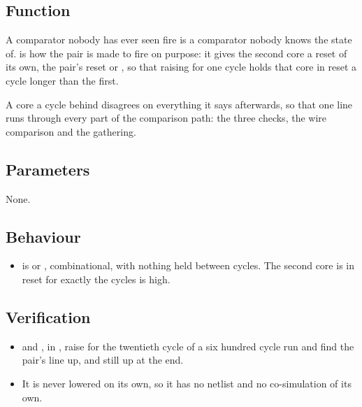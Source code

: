 
%
{}

\subsection*{Function}

A comparator nobody has ever seen fire is a comparator nobody knows the
state of.  is how the pair is made to fire on purpose: it
gives the second core a reset of its own, the pair's reset or
, so that raising  for one cycle holds that
core in reset a cycle longer than the first.

A core a cycle behind disagrees on everything it says afterwards, so
that one line runs through every part of the comparison path: the three
checks, the wire comparison and the gathering.

\subsection*{Parameters}

None.


\subsection*{Behaviour}

\begin{itemize}
\item {} is  or , combinational, with
nothing held between cycles. The second core is in reset for exactly
the cycles  is high.
\end{itemize}

\subsection*{Verification}

\begin{itemize}
\item {} and
, in
, raise  for the twentieth cycle
of a six hundred cycle run and find the pair's line up, and still up at
the end.
\item It is never lowered on its own, so it has no netlist and no
co-simulation of its own.
\end{itemize}

